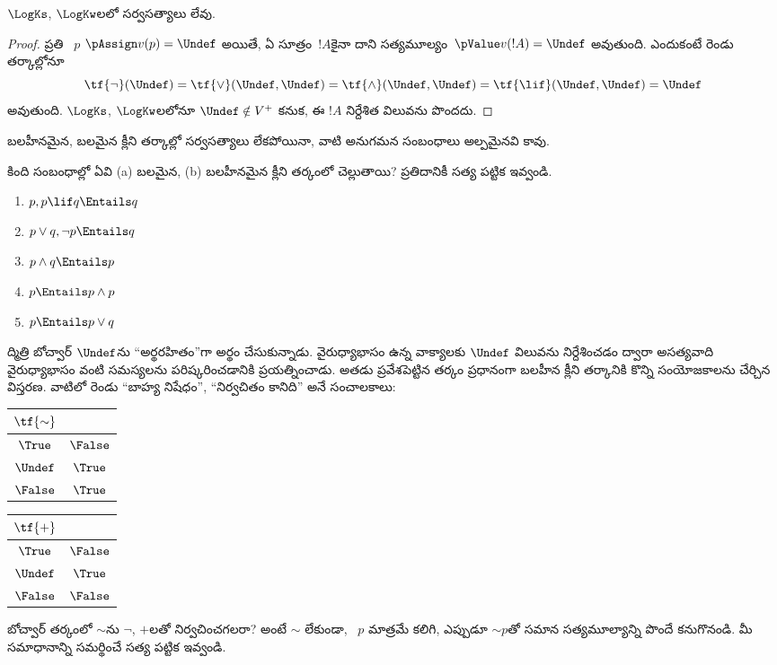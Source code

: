 \documentclass[../../../include/open-logic-section]{subfiles}
\begin{document}
\begin{prop}
  $\LogKs$, $\LogKw$లలో సర్వసత్యాలు లేవు.
\end{prop}

\begin{proof}
  ప్రతి ~$p$
  $\pAssign v(p) = \Undef$ అయితే, ఏ సూత్రం~$!A$కైనా
  దాని సత్యమూల్యం~$\pValue v(!A) =
  \Undef$ అవుతుంది. ఎందుకంటే రెండు తర్కాల్లోనూ
  \[
    \tf{\lnot}(\Undef) = \tf{\lor}(\Undef, \Undef) = \tf{\land}(\Undef,
  \Undef) = \tf{\lif}(\Undef, \Undef) = \Undef
  \]
  అవుతుంది. $\LogKs$, $\LogKw$లలోనూ
  $\Undef \notin V^+$ కనుక, ఈ
  $!A$ నిర్దేశిత విలువను పొందదు.
\end{proof}

బలహీనమైన, బలమైన క్లీని తర్కాల్లో సర్వసత్యాలు
లేకపోయినా, వాటి అనుగమన సంబంధాలు అల్పమైనవి కావు.

\begin{prob}
  కింది సంబంధాల్లో ఏవి (a) బలమైన,
  (b) బలహీనమైన క్లీని తర్కంలో చెల్లుతాయి?
  ప్రతిదానికీ సత్య పట్టిక ఇవ్వండి.
  \begin{enumerate}
    \item $p, p \lif q \Entails q$
    \item $p \lor q, \lnot p \Entails q$
    \item $p \land q \Entails p$
    \item $p \Entails p \land p$
    \item $p \Entails p \lor q$
  \end{enumerate}
\end{prob}

ద్మిత్రి బోచ్వార్ $\Undef$ను “అర్థరహితం”గా
అర్థం చేసుకున్నాడు. వైరుధ్యాభాసం ఉన్న వాక్యాలకు
$\Undef$ విలువను నిర్దేశించడం ద్వారా
అసత్యవాది వైరుధ్యాభాసం వంటి సమస్యలను
పరిష్కరించడానికి ప్రయత్నించాడు. అతడు ప్రవేశపెట్టిన తర్కం
ప్రధానంగా బలహీన క్లీని తర్కానికి కొన్ని సంయోజకాలను చేర్చిన విస్తరణ.
వాటిలో రెండు “బాహ్య నిషేధం”, “నిర్వచితం
కానిది” అనే సంచాలకాలు:
\begin{center}
  \begin{tabular}{c|c}
    $\tf{\sim}$ & \\
    \hline
    $\True$ & $\False$ \\
    $\Undef$ & $\True$ \\
    $\False$ & $\True$
  \end{tabular}
\quad
  \begin{tabular}{c|c}
    $\tf{+}$ & \\
    \hline
    $\True$ & $\False$ \\
    $\Undef$ & $\True$ \\
    $\False$ & $\False$
  \end{tabular}
\end{center}

\begin{prob}
  బోచ్వార్ తర్కంలో $\sim$ను $\lnot$,
  $+$లతో నిర్వచించగలరా? అంటే $\sim$ లేకుండా,
  ~$p$ మాత్రమే కలిగి, ఎప్పుడూ
  $\mathord{\sim}p$తో సమాన సత్యమూల్యాన్ని
  పొందే 
  కనుగొనండి. మీ సమాధానాన్ని సమర్థించే
  సత్య పట్టిక ఇవ్వండి.
\end{prob}
\end{document}
